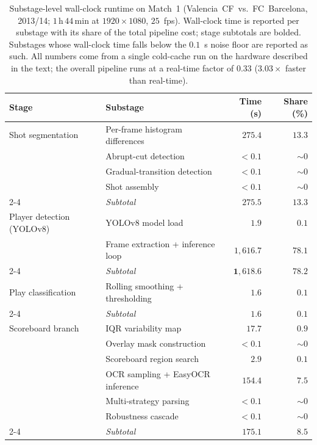 \begin{table}[!tbp]
\centering
\caption{Substage-level wall-clock runtime on Match~1 (Valencia~CF~vs.~FC~Barcelona, 2013/14; $1\,\mathrm{h}\,44\,\mathrm{min}$ at $1920\times 1080$, $25$~fps). Wall-clock time is reported per substage with its share of the total pipeline cost; stage subtotals are bolded. Substages whose wall-clock time falls below the $0.1$~s noise floor are reported as such. All numbers come from a single cold-cache run on the hardware described in the text; the overall pipeline runs at a real-time factor of $0.33$ ($3.03\times$ faster than real-time).}
\label{tab:runtime}
\setlength{\tabcolsep}{4pt}
\begin{tabular}{llrr}
\toprule
\textbf{Stage} & \textbf{Substage} & \textbf{Time (s)} & \textbf{Share (\%)} \\
\midrule
Shot segmentation & Per-frame histogram differences & $275.4$ & $13.3$ \\
 & Abrupt-cut detection & $< 0.1$ & $\sim 0$ \\
 & Gradual-transition detection & $< 0.1$ & $\sim 0$ \\
 & Shot assembly & $< 0.1$ & $\sim 0$ \\
\cmidrule(lr){2-4}
 & \textit{Subtotal} & $\mathbf{275.5}$ & $\mathbf{13.3}$ \\
\midrule
Player detection (YOLOv8) & YOLOv8 model load & $1.9$ & $0.1$ \\
 & Frame extraction + inference loop & $1{,}616.7$ & $78.1$ \\
\cmidrule(lr){2-4}
 & \textit{Subtotal} & $\mathbf{1{,}618.6}$ & $\mathbf{78.2}$ \\
\midrule
Play classification & Rolling smoothing + thresholding & $1.6$ & $0.1$ \\
\cmidrule(lr){2-4}
 & \textit{Subtotal} & $\mathbf{1.6}$ & $\mathbf{0.1}$ \\
\midrule
Scoreboard branch & IQR variability map & $17.7$ & $0.9$ \\
 & Overlay mask construction & $< 0.1$ & $\sim 0$ \\
 & Scoreboard region search & $2.9$ & $0.1$ \\
 & OCR sampling + EasyOCR inference & $154.4$ & $7.5$ \\
 & Multi-strategy parsing & $< 0.1$ & $\sim 0$ \\
 & Robustness cascade & $< 0.1$ & $\sim 0$ \\
\cmidrule(lr){2-4}
 & \textit{Subtotal} & $\mathbf{175.1}$ & $\mathbf{8.5}$ \\

\end{tabular}
\end{table}
